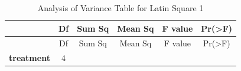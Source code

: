 \documentclass[]{article}
\begin{document}
\begin{longtable}[]{@{}cccccc@{}}
\caption{Analysis of Variance Table for Latin Square 1}\tabularnewline
\toprule
\begin{minipage}[b]{0.19\columnwidth}\centering\strut
~\strut
\end{minipage} & \begin{minipage}[b]{0.06\columnwidth}\centering\strut
Df\strut
\end{minipage} & \begin{minipage}[b]{0.10\columnwidth}\centering\strut
Sum Sq\strut
\end{minipage} & \begin{minipage}[b]{0.12\columnwidth}\centering\strut
Mean Sq\strut
\end{minipage} & \begin{minipage}[b]{0.12\columnwidth}\centering\strut
F value\strut
\end{minipage} & \begin{minipage}[b]{0.12\columnwidth}\centering\strut
Pr(\textgreater{}F)\strut
\end{minipage}\tabularnewline
\midrule
\endfirsthead
\toprule
\begin{minipage}[b]{0.19\columnwidth}\centering\strut
~\strut
\end{minipage} & \begin{minipage}[b]{0.06\columnwidth}\centering\strut
Df\strut
\end{minipage} & \begin{minipage}[b]{0.10\columnwidth}\centering\strut
Sum Sq\strut
\end{minipage} & \begin{minipage}[b]{0.12\columnwidth}\centering\strut
Mean Sq\strut
\end{minipage} & \begin{minipage}[b]{0.12\columnwidth}\centering\strut
F value\strut
\end{minipage} & \begin{minipage}[b]{0.12\columnwidth}\centering\strut
Pr(\textgreater{}F)\strut
\end{minipage}\tabularnewline
\midrule
\endhead
\begin{minipage}[t]{0.19\columnwidth}\centering\strut
\textbf{treatment}\strut
\end{minipage} & \begin{minipage}[t]{0.06\columnwidth}\centering\strut
4\strut
\end{minipage} & \begin{minipage}[t]{0.10\columnwidth}\centering\strut

\end{minipage}
\end{longtable}
\end{document}
